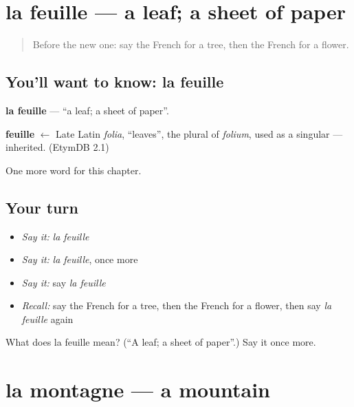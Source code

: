 \section[la feuille]{la feuille — a leaf; a sheet of paper}

\label{lesson:FR-C81-feuille}



\begin{quote}
Before the new one: say the French for a tree, then the French for a flower.
\end{quote}

\subsection*{You'll want to know: la feuille}
\textbf{la feuille} — \textquotedblleft{}a leaf; a sheet of paper\textquotedblright{}.

\begin{cousinweb}
\textbf{feuille} $\leftarrow$ Late Latin \emph{folia}, \textquotedblleft{}leaves\textquotedblright{}, the plural of \emph{folium}, used as a singular — inherited. (EtymDB 2.1)
\end{cousinweb}

\begin{grammarlens}[title={What you've built}]
One more word for this chapter.
\end{grammarlens}

\subsection*{Your turn}
\begin{itemize}
\raggedright
  \item \emph{Say it:} \emph{la feuille}
  \item \emph{Say it:} \emph{la feuille}, once more
  \item \emph{Say it:} say \emph{la feuille}
  \item \emph{Recall:} say the French for a tree, then the French for a flower, then say \emph{la feuille} again
\end{itemize}

\begin{tcolorbox}[breakable,colback=teal!4,colframe=teal!35!black,title={Before you move on}]
What does la feuille mean? (\textquotedblleft{}A leaf; a sheet of paper\textquotedblright{}.) Say it once more.
\end{tcolorbox}
\section[la montagne]{la montagne — a mountain}

